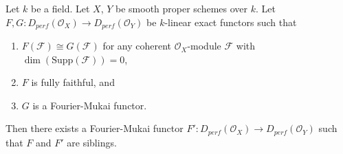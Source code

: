 \begin{lemma}
\label{lemma-two-functors}
Let $k$ be a field. Let $X$, $Y$ be smooth proper schemes over $k$.
Let $F, G : D_{perf}(\mathcal{O}_X) \to D_{perf}(\mathcal{O}_Y)$
be $k$-linear exact functors such that
\begin{enumerate}
\item $F(\mathcal{F}) \cong G(\mathcal{F})$ for any coherent
$\mathcal{O}_X$-module $\mathcal{F}$ with $\dim(\text{Supp}(\mathcal{F})) = 0$,
\item $F$ is fully faithful, and
\item $G$ is a Fourier-Mukai functor.
\end{enumerate}
Then there exists a Fourier-Mukai functor
$F' : D_{perf}(\mathcal{O}_X) \to D_{perf}(\mathcal{O}_Y)$
such that $F$ and $F'$ are siblings.
\end{lemma}

